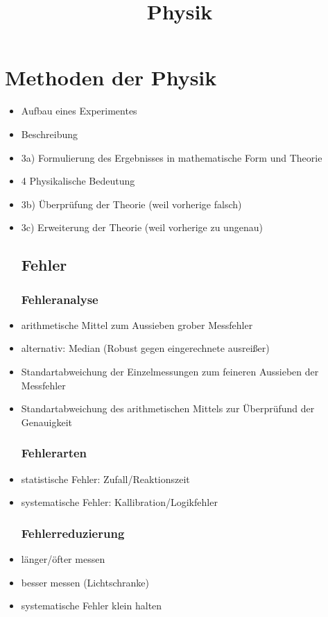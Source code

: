 \documentclass[a4paper,12pt]{scrartcl}
\begin{document}
\title{Physik}
\maketitle

\section{Methoden der Physik} \label{sec:Methoden der Physik}

\begin{itemize}
\item Aufbau eines Experimentes
\item Beschreibung
\item 3a) Formulierung des Ergebnisses in mathematische Form und Theorie
\item 4 Physikalische Bedeutung
\item 3b) Überprüfung der Theorie (weil vorherige falsch)
\item 3c) Erweiterung der Theorie (weil vorherige zu ungenau)

\subsection{Fehler} \label{sec:Fehler}
\subsubsection{Fehleranalyse} \label{sec:Fehleranalyse}

\item arithmetische Mittel zum Aussieben grober Messfehler
\item alternativ: Median (Robust gegen eingerechnete ausreißer)
\item Standartabweichung der Einzelmessungen zum feineren Aussieben der Messfehler
\item Standartabweichung des arithmetischen Mittels zur Überprüfund der Genauigkeit

\subsubsection{Fehlerarten} \label{sec:Fehlerarten}

\item statistische Fehler: Zufall/Reaktionszeit
\item systematische Fehler: Kallibration/Logikfehler

\subsubsection{Fehlerreduzierung} \label{sec:Fehlerreduzierung}

\item länger/öfter messen
\item besser messen (Lichtschranke)
\item systematische Fehler klein halten
\end{itemize}
\end{document}
